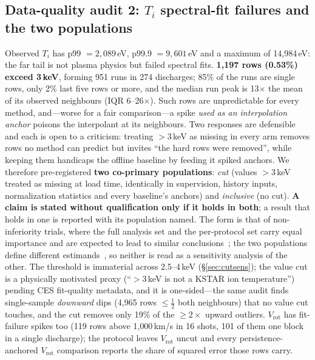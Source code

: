 \documentclass[10pt]{article}
\newcommand{\Ti}{\ensuremath{T_i}}
\newcommand{\Vrot}{\ensuremath{V_\mathrm{rot}}}
\begin{document}
\subsection{Data-quality audit 2: \Ti{} spectral-fit failures and the two
populations}
\label{sec:spikes}
Observed \Ti{} has p99 $= 2{,}089$\,eV, p99.9 $= 9{,}601$\,eV and a maximum of
14{,}984\,eV: the far tail is not plasma physics but failed spectral fits.
\textbf{1{,}197 rows (0.53\%) exceed 3\,keV}, forming 951 runs in 274 discharges;
85\% of the runs are single rows, only 2\% last five rows or more, and the median
run peak is 13$\times$ the mean of its observed neighbours (IQR 6--26$\times$).
Such rows are unpredictable for every method, and---worse for a fair comparison---a
spike \emph{used as an interpolation anchor} poisons the interpolant at its
neighbours. Two responses are defensible and each is open to a criticism: treating
$>$3\,keV as missing in every arm removes rows no method can predict but invites
``the hard rows were removed'', while keeping them handicaps the offline baseline
by feeding it spiked anchors. We therefore pre-registered \textbf{two co-primary
populations}: \emph{cut} (values $>$3\,keV treated as missing at load time,
identically in supervision, history inputs, normalization statistics and every
baseline's anchors) and \emph{inclusive} (no cut). \textbf{A claim is stated
without qualification only if it holds in both}; a result that holds in one is
reported with its population named. The form is that of non-inferiority trials, where
the full analysis set and the per-protocol set carry equal importance and are
expected to lead to similar conclusions~\citep{CPMP2000Switching}; the two populations
define different estimands~\citep{ICH2019E9R1}, so neither is read as a sensitivity
analysis of the other. The threshold is immaterial across
2.5--4\,keV (\S\ref{sec:cutsens}); the value cut is a physically motivated proxy
(``$>$3\,keV is not a KSTAR ion temperature'') pending CES fit-quality metadata,
and it is one-sided---the same audit finds single-sample \emph{downward} dips
(4{,}965 rows $\leq\tfrac12$ both neighbours) that no value cut touches, and the
cut removes only 19\% of the $\geq 2\times$ upward outliers. \Vrot{} has
fit-failure spikes too (119 rows above 1{,}000\,km/s in 16 shots, 101 of them one
block in a single discharge); the protocol leaves \Vrot{} uncut and every
persistence-anchored \Vrot{} comparison reports the share of squared error those
rows carry.

\end{document}
